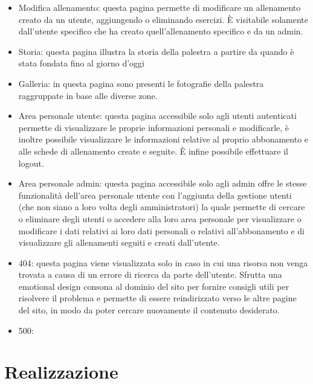 \documentclass[a4paper]{article}
\begin{document}
\begin{itemize}
        \item Modifica allenamento: questa pagina permette di modificare un allenamento creato da un utente, aggiungendo o eliminando esercizi. È visitabile solamente dall’utente specifico che ha creato quell’allenamento specifico e da un admin.
        \item Storia: questa pagina illustra la storia della palestra a partire da quando è stata fondata fino al giorno d’oggi
        \item Galleria: in questa pagina sono presenti le fotografie della palestra raggruppate in base alle diverse zone.
        \item Area personale utente: questa pagina accessibile solo agli utenti autenticati permette di visualizzare le proprie informazioni personali e modificarle, è inoltre possibile visualizzare le informazioni relative al proprio abbonamento e alle schede di allenamento create e seguite. È infine possibile effettuare il logout.
        \item Area personale admin: questa pagina accessibile solo agli admin offre le stesse funzionalità dell’area personale utente con l’aggiunta della gestione utenti (che non siano a loro volta degli amministratori) la quale permette di cercare o eliminare degli utenti o accedere alla loro area personale per visualizzare o modificare i dati relativi ai loro dati personali o relativi all’abbonamento e di visualizzare gli allenamenti seguiti e creati dall’utente.
        \item 404: questa pagina viene visualizzata solo in caso in cui una risorsa non venga trovata a causa di un errore di ricerca da parte dell’utente. Sfrutta una emotional design consona al dominio del sito per fornire consigli utili per risolvere il problema e permette di essere reindirizzato verso le altre pagine del sito, in modo da poter cercare nuovamente il contenuto desiderato.
        \item 500:
    \end{itemize}

    \section{Realizzazione}
\end{document}
